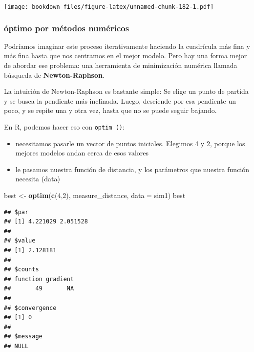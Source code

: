 \documentclass[]{book}
\newenvironment{Shaded}{\begin{snugshade}}{\end{snugshade}}
\newcommand{\DataTypeTok}[1]{\textcolor[rgb]{0.13,0.29,0.53}{#1}}
\newcommand{\DecValTok}[1]{\textcolor[rgb]{0.00,0.00,0.81}{#1}}
\newcommand{\KeywordTok}[1]{\textcolor[rgb]{0.13,0.29,0.53}{\textbf{#1}}}
\newcommand{\NormalTok}[1]{#1}
\newcommand{\OperatorTok}[1]{\textcolor[rgb]{0.81,0.36,0.00}{\textbf{#1}}}
\newcommand{\StringTok}[1]{\textcolor[rgb]{0.31,0.60,0.02}{#1}}
\providecommand{\tightlist}{%
  \setlength{\itemsep}{0pt}\setlength{\parskip}{0pt}}
\begin{document}
\texttt{[image: bookdown\_files/figure-latex/unnamed-chunk-182-1.pdf]}

\hypertarget{optimo-por-metodos-numericos}{%
\subsubsection{óptimo por métodos numéricos}\label{optimo-por-metodos-numericos}}

Podríamos imaginar este proceso iterativamente haciendo la cuadrícula más fina y más fina hasta que nos centramos en el mejor modelo. Pero hay una forma mejor de abordar ese problema: una herramienta de minimización numérica llamada búsqueda de \textbf{Newton-Raphson}.

La intuición de Newton-Raphson es bastante simple: Se elige un punto de partida y se busca la pendiente más inclinada. Luego, desciende por esa pendiente un poco, y se repite una y otra vez, hasta que no se puede seguir bajando.

En R, podemos hacer eso con \texttt{optim\ ()}:

\begin{itemize}
\tightlist
\item
  necesitamos pasarle un vector de puntos iniciales. Elegimos 4 y 2, porque los mejores modelos andan cerca de esos valores
\item
  le pasamos nuestra función de distancia, y los parámetros que nuestra función necesita (data)
\end{itemize}

\begin{Shaded}
\begin{Highlighting}[]
\NormalTok{best <-}\StringTok{ }\KeywordTok{optim}\NormalTok{(}\KeywordTok{c}\NormalTok{(}\DecValTok{4}\NormalTok{,}\DecValTok{2}\NormalTok{), measure_distance, }\DataTypeTok{data =}\NormalTok{ sim1)}
\NormalTok{best}
\end{Highlighting}
\end{Shaded}

\begin{verbatim}
## $par
## [1] 4.221029 2.051528
## 
## $value
## [1] 2.128181
## 
## $counts
## function gradient 
##       49       NA 
## 
## $convergence
## [1] 0
## 
## $message
## NULL
\end{verbatim}

\begin{Shaded}
\end{Shaded}
\end{document}
